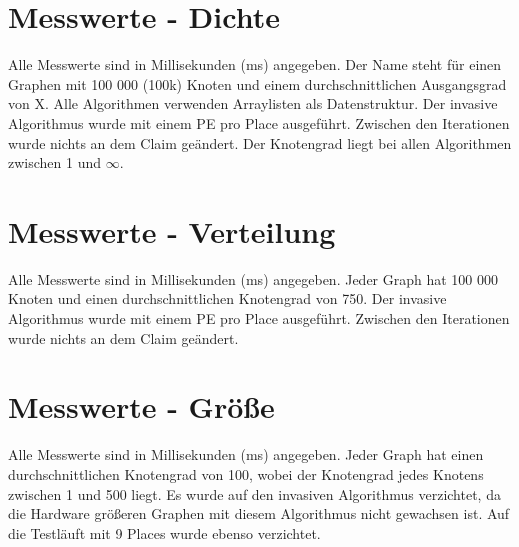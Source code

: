 

\appendix
{}

\section{Messwerte - Dichte}
\label{Anhang-Messwerte}
Alle Messwerte sind in Millisekunden (ms) angegeben. Der Name  steht für einen Graphen mit 100 000 (100k) Knoten und einem durchschnittlichen Ausgangsgrad von X. Alle Algorithmen verwenden Arraylisten als Datenstruktur. Der invasive Algorithmus wurde mit einem PE pro Place ausgeführt. Zwischen den Iterationen wurde nichts an dem Claim geändert. Der Knotengrad liegt bei allen Algorithmen zwischen 1 und $\infty$.
 

\section{Messwerte - Verteilung}
Alle Messwerte sind in Millisekunden (ms) angegeben. Jeder Graph hat 100 000 Knoten und einen durchschnittlichen Knotengrad von 750. Der invasive Algorithmus wurde mit einem PE pro Place ausgeführt. Zwischen den Iterationen wurde nichts an dem Claim geändert.


\section{Messwerte - Größe}
Alle Messwerte sind in Millisekunden (ms) angegeben. Jeder Graph hat einen durchschnittlichen Knotengrad von 100, wobei der Knotengrad jedes Knotens zwischen 1 und 500 liegt. Es wurde auf den invasiven Algorithmus verzichtet, da die Hardware größeren Graphen mit diesem Algorithmus nicht gewachsen ist. Auf die Testläuft mit 9 Places wurde ebenso verzichtet.


		
